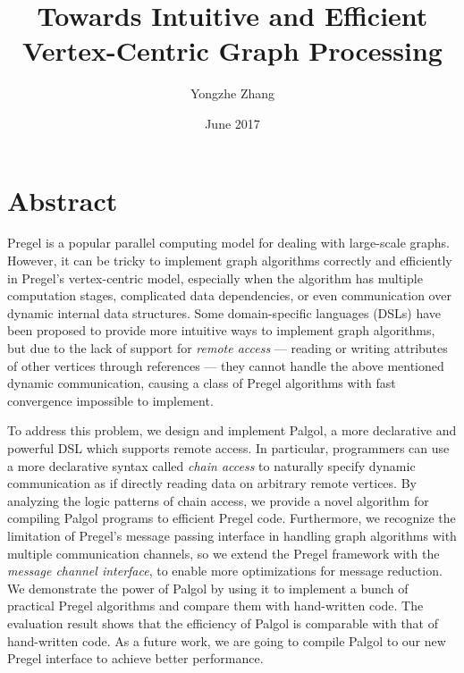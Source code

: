 \documentclass{sokendai_thesis} %
\title{Towards Intuitive and Efficient Vertex-Centric Graph Processing}
\author{Yongzhe Zhang}
\date{June 2017}
\begin{document}
\frontmatter
\maketitle

\listoftodos

\chapter*{Abstract}

Pregel is a popular parallel computing model for dealing with large-scale graphs.
However, it can be tricky to implement graph algorithms correctly and efficiently in Pregel's vertex-centric model, especially when the algorithm has multiple computation stages, complicated data dependencies, or even communication over dynamic internal data structures.
Some domain-specific languages (DSLs) have been proposed to provide more intuitive ways to implement graph algorithms, but due to the lack of support for \emph{remote access} --- reading or writing attributes of other vertices through references --- they cannot handle the above mentioned dynamic communication, causing a class of Pregel algorithms with fast convergence impossible to implement.

To address this problem, we design and implement Palgol, a more declarative and powerful DSL which supports remote access.
In particular, programmers can use a more declarative syntax called \emph{chain access} to naturally specify dynamic communication as if directly reading data on arbitrary remote vertices.
By analyzing the logic patterns of chain access, we provide a novel algorithm for compiling Palgol programs to efficient Pregel code.
Furthermore, we recognize the limitation of Pregel's message passing interface in handling graph algorithms with multiple communication channels, so we extend the Pregel framework with the \emph{message channel interface}, to enable more optimizations for message reduction.
We demonstrate the power of Palgol by using it to implement a bunch of practical Pregel algorithms and compare them with hand-written code.
The evaluation result shows that the efficiency of Palgol is comparable with that of hand-written code. %
As a future work, we are going to compile Palgol to our new Pregel interface to achieve better performance.

\tableofcontents
\end{document}
